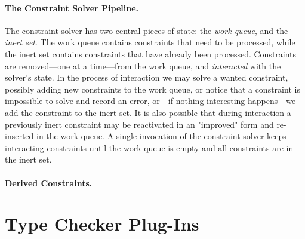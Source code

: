 \documentclass{sigplanconf}
\begin{document}
\paragraph{The Constraint Solver Pipeline.}
The constraint solver has two central pieces of state: the {\em work queue},
and the {\em inert set}.  The work queue contains constraints that need to be
processed, while the inert set contains constraints that have already
been processed.  Constraints are removed---one at a time---from the work queue,
and {\em interacted} with the solver's state.  In the process of interaction
we may solve a wanted constraint, possibly adding new constraints to the
work queue, or notice that a constraint is impossible to solve and record
an error, or---if nothing interesting happens---we add the constraint
to the inert set.  It is also possible that during interaction a previously
inert constraint may be reactivated in an "improved" form and re-inserted
in the work queue.  A single invocation of the constraint solver keeps
interacting constraints until the work queue is empty and all constraints
are in the inert set.

\paragraph{Derived Constraints.}


\section{Type Checker Plug-Ins}















% 
% 
% 
% 
\end{document}
